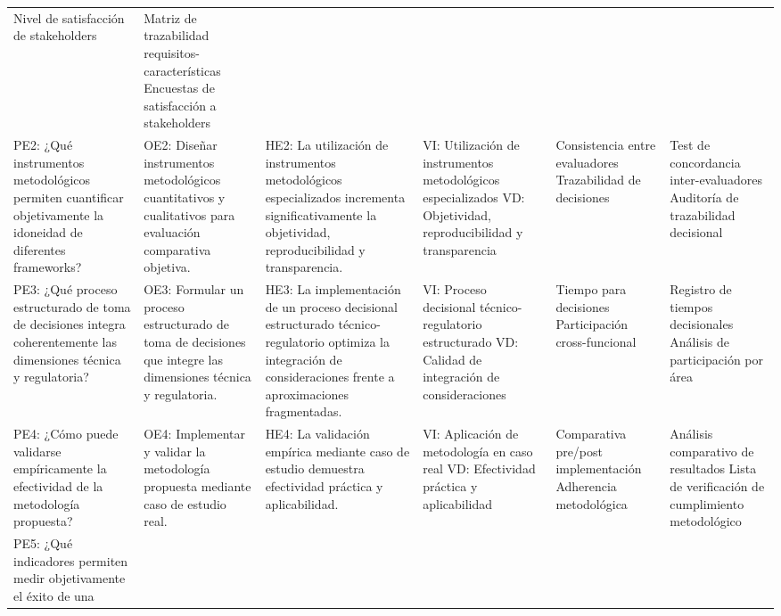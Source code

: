 \begin{landscape}
\begin{spacing}{1}
\begin{longtable}{@{}p{4.1cm}p{4.1cm}p{4.1cm}p{4.1cm}p{4.1cm}p{4.1cm}@{}}
Nivel de satisfacción de stakeholders
&
Matriz de trazabilidad requisitos-características \newline
Encuestas de satisfacción a stakeholders \\
\addlinespace
PE2: ¿Qué instrumentos metodológicos permiten cuantificar objetivamente la
idoneidad de diferentes frameworks?
&
OE2: Diseñar instrumentos metodológicos cuantitativos y cualitativos para
evaluación comparativa objetiva.
&
HE2: La utilización de instrumentos metodológicos especializados incrementa
significativamente la objetividad, reproducibilidad y transparencia.
&
VI: Utilización de instrumentos metodológicos especializados \newline
VD: Objetividad, reproducibilidad y transparencia
&
Consistencia entre evaluadores \newline
Trazabilidad de decisiones
&
Test de concordancia inter-evaluadores \newline
Auditoría de trazabilidad decisional \\
\addlinespace
PE3: ¿Qué proceso estructurado de toma de decisiones integra
coherentemente las dimensiones técnica y regulatoria?
&
OE3: Formular un proceso estructurado de toma de decisiones que integre
las dimensiones técnica y regulatoria.
&
HE3: La implementación de un proceso decisional estructurado
técnico-regulatorio optimiza la integración de consideraciones frente a
aproximaciones fragmentadas.
&
VI: Proceso decisional técnico-regulatorio estructurado \newline
VD: Calidad de integración de consideraciones
&
Tiempo para decisiones \newline
Participación cross-funcional
&
Registro de tiempos decisionales \newline
Análisis de participación por área \\
\addlinespace
PE4: ¿Cómo puede validarse empíricamente la efectividad de la metodología
propuesta?
&
OE4: Implementar y validar la metodología propuesta mediante caso de
estudio real.
&
HE4: La validación empírica mediante caso de estudio demuestra efectividad
práctica y aplicabilidad.
&
VI: Aplicación de metodología en caso real \newline
VD: Efectividad práctica y aplicabilidad
&
Comparativa pre/post implementación \newline
Adherencia metodológica
&
Análisis comparativo de resultados \newline
Lista de verificación de cumplimiento metodológico \\
\addlinespace
PE5: ¿Qué indicadores permiten medir objetivamente el éxito de una

\end{longtable}
\end{spacing}
\end{landscape}
